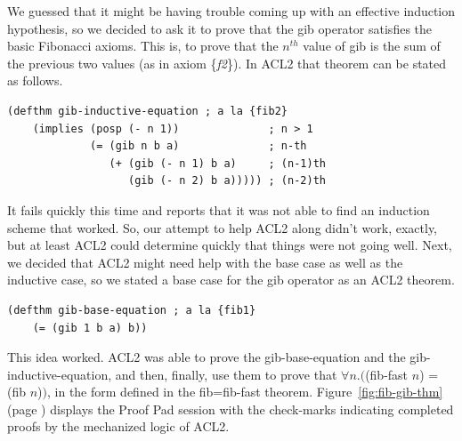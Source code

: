 We guessed that it might be having trouble coming up with an effective
induction hypothesis, so we decided to ask it to prove that
the gib operator satisfies the basic Fibonacci axioms.
This is, to prove that the $n^{th}$ value of gib is
the sum of the previous two values (as in axiom \{\emph{f2}\}).
In ACL2 that theorem can be stated as follows.
\begin{samepage}
\begin{center}
\begin{Verbatim}
(defthm gib-inductive-equation ; a la {fib2}
    (implies (posp (- n 1))              ; n > 1
             (= (gib n b a)              ; n-th
                (+ (gib (- n 1) b a)     ; (n-1)th
                   (gib (- n 2) b a))))) ; (n-2)th
\end{Verbatim}
\end{center}
\end{samepage}

It fails quickly this time and reports that it was not able
to find an induction scheme that worked.
So, our attempt to help ACL2 along didn't work, exactly,
but at least ACL2 could determine quickly that
things were not going well.
Next, we decided that ACL2 might need help with the
base case as well as the inductive case, so we
stated a base case for the gib operator as an ACL2 theorem.

\begin{samepage}
\begin{center}
\begin{Verbatim}
(defthm gib-base-equation ; a la {fib1}
    (= (gib 1 b a) b))
\end{Verbatim}
\end{center}
\end{samepage}

This idea worked. ACL2 was able to prove the gib-base-equation
and the gib-inductive-equation, and then, finally,
use them to prove that $\forall n.($(fib-fast $n$) = (fib $n$)$)$,
in the form defined in the fib=fib-fast theorem.
Figure~\ref{fig:fib-gib-thm} (page \pageref{fig:fib-gib-thm})
displays the Proof Pad session with the check-marks
indicating completed proofs by the mechanized logic of ACL2.

